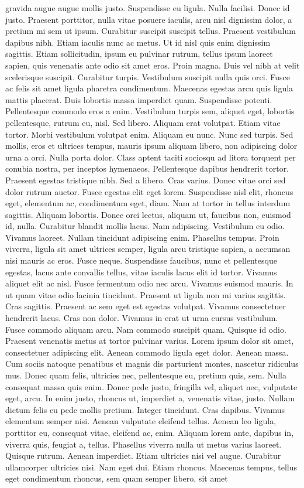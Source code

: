 gravida augue augue mollis justo. Suspendisse eu ligula. Nulla facilisi. Donec id justo. Praesent porttitor, nulla vitae posuere iaculis, arcu nisl dignissim dolor, a pretium mi sem ut ipsum. Curabitur suscipit suscipit tellus. Praesent vestibulum dapibus nibh. Etiam iaculis nunc ac metus. Ut id nisl quis enim dignissim sagittis. Etiam sollicitudin, ipsum eu pulvinar rutrum, tellus ipsum laoreet sapien, quis venenatis ante odio sit amet eros. Proin magna. Duis vel nibh at velit scelerisque suscipit. Curabitur turpis. Vestibulum suscipit nulla quis orci. Fusce ac felis sit amet ligula pharetra condimentum. Maecenas egestas arcu quis ligula mattis placerat. Duis lobortis massa imperdiet quam. Suspendisse potenti. Pellentesque commodo eros a enim. Vestibulum turpis sem, aliquet eget, lobortis pellentesque, rutrum eu, nisl. Sed libero. Aliquam erat volutpat. Etiam vitae tortor. Morbi vestibulum volutpat enim. Aliquam eu nunc. Nunc sed turpis. Sed mollis, eros et ultrices tempus, mauris ipsum aliquam libero, non adipiscing dolor urna a orci. Nulla porta dolor. Class aptent taciti sociosqu ad litora torquent per conubia nostra, per inceptos hymenaeos. Pellentesque dapibus hendrerit tortor. Praesent egestas tristique nibh. Sed a libero. Cras varius. Donec vitae orci sed dolor rutrum auctor. Fusce egestas elit eget lorem. Suspendisse nisl elit, rhoncus eget, elementum ac, condimentum eget, diam. Nam at tortor in tellus interdum sagittis. Aliquam lobortis. Donec orci lectus, aliquam ut, faucibus non, euismod id, nulla. Curabitur blandit mollis lacus. Nam adipiscing. Vestibulum eu odio. Vivamus laoreet. Nullam tincidunt adipiscing enim. Phasellus tempus. Proin viverra, ligula sit amet ultrices semper, ligula arcu tristique sapien, a accumsan nisi mauris ac eros. Fusce neque. Suspendisse faucibus, nunc et pellentesque egestas, lacus ante convallis tellus, vitae iaculis lacus elit id tortor. Vivamus aliquet elit ac nisl. Fusce fermentum odio nec arcu. Vivamus euismod mauris. In ut quam vitae odio lacinia tincidunt. Praesent ut ligula non mi varius sagittis. Cras sagittis. Praesent ac sem eget est egestas volutpat. Vivamus consectetuer hendrerit lacus. Cras non dolor. Vivamus in erat ut urna cursus vestibulum. Fusce commodo aliquam arcu. Nam commodo suscipit quam. Quisque id odio. Praesent venenatis metus at tortor pulvinar varius. Lorem ipsum dolor sit amet, consectetuer adipiscing elit. Aenean commodo ligula eget dolor. Aenean massa. Cum sociis natoque penatibus et magnis dis parturient montes, nascetur ridiculus mus. Donec quam felis, ultricies nec, pellentesque eu, pretium quis, sem. Nulla consequat massa quis enim. Donec pede justo, fringilla vel, aliquet nec, vulputate eget, arcu. In enim justo, rhoncus ut, imperdiet a, venenatis vitae, justo. Nullam dictum felis eu pede mollis pretium. Integer tincidunt. Cras dapibus. Vivamus elementum semper nisi. Aenean vulputate eleifend tellus. Aenean leo ligula, porttitor eu, consequat vitae, eleifend ac, enim. Aliquam lorem ante, dapibus in, viverra quis, feugiat a, tellus. Phasellus viverra nulla ut metus varius laoreet. Quisque rutrum. Aenean imperdiet. Etiam ultricies nisi vel augue. Curabitur ullamcorper ultricies nisi. Nam eget dui. Etiam rhoncus. Maecenas tempus, tellus eget condimentum rhoncus, sem quam semper libero, sit amet 